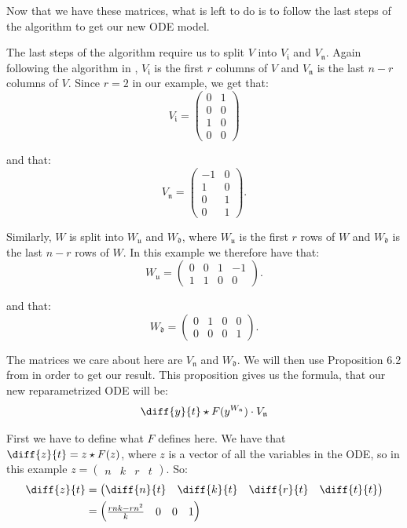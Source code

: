 \documentclass[oneside, a4paper, onecolumn, 11pt]{article}
\begin{document}
Now that we have these matrices, what is left to do is to follow the last steps of the algorithm to get our new ODE model.

The last steps of the algorithm require us to split \(V\) into \(V_{\mathfrak{i}}\) and \(V_{\mathfrak{n}}\). Again following the algorithm in \cite{Hubert2013}, \(V_{\mathfrak{i}}\) is the first \(r\) columns of \(V\) and \(V_{\mathfrak{n}}\) is the last \(n - r\) columns of \(V\). Since \(r = 2\) in our example, we get that:
\[
    V_{\mathfrak{i}} = \begin{pmatrix}
        0 & 1 \\
        0 & 0 \\
        1 & 0 \\
        0 & 0
    \end{pmatrix}
\]

and that:
\[
    V_{\mathfrak{n}} = \begin{pmatrix}
        -1 & 0 \\
        1  & 0 \\
        0  & 1 \\
        0  & 1
    \end{pmatrix}.
\]

Similarly, \(W\) is split into \(W_{\mathfrak{u}}\) and \(W_{\mathfrak{d}}\), where \(W_{\mathfrak{u}}\) is the first \(r\) rows of \(W\) and \(W_{\mathfrak{d}}\) is the last \(n - r\) rows of \(W\). In this example we therefore have that:
\[
    W_{\mathfrak{u}} = \begin{pmatrix}
        0 & 0 & 1 & -1 \\
        1 & 1 & 0 & 0
    \end{pmatrix}.
\]

and that:
\[
    W_{\mathfrak{d}} = \begin{pmatrix}
        0 & 1 & 0 & 0 \\
        0 & 0 & 0 & 1
    \end{pmatrix}.
\]

The matrices we care about here are \(V_{\mathfrak{n}}\) and \(W_{\mathfrak{d}}\). We will then use Proposition 6.2 from \cite{Hubert2013} in order to get our result. This proposition gives us the formula, that our new reparametrized ODE will be:
\[
    \diff{y}{t} \star F(y^{W_{\mathfrak{n}}}) \cdot V_{\mathfrak{n}}
\]

First we have to define what \(F\) defines here. We have that \(\diff{z}{t} = z\star F(z)\), where \(z\) is a vector of all the variables in the ODE, so in this example \(z = \begin{pmatrix} n & k & r & t \end{pmatrix}\). So:
\begin{align*}
    \diff{z}{t}
     & = \begin{pmatrix}
             \diff{n}{t} & \diff{k}{t} & \diff{r}{t} & \diff{t}{t}
         \end{pmatrix} \\
     & = \begin{pmatrix}
             \frac{rnk - rn^2}{k} & 0 & 0 & 1 \\
         \end{pmatrix}
\end{align*}
\end{document}

